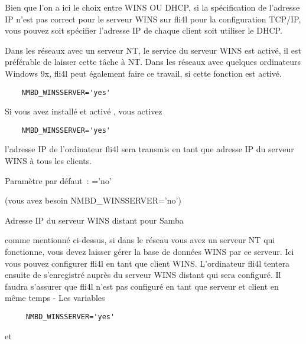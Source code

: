 \begin{description}
    Bien que l'on a ici le choix entre WINS OU DHCP, si la spécification de
    l'adresse IP n'est pas correct pour le serveur WINS sur fli4l pour la
    configuration TCP/IP, vous pouvez soit spécifier l'adresse IP de chaque
    client soit utiliser le DHCP.

    Dans les réseaux avec un serveur NT, le service du serveur WINS est activé,
    il est préférable de laisser cette tâche à NT. Dans les réseaux avec
    quelques ordinateurs Windows 9x, fli4l peut également faire ce travail, si
    cette fonction est activé.

\begin{example}
\begin{verbatim}
    NMBD_WINSSERVER='yes'
\end{verbatim}
\end{example}

    Si vous avez installé et activé , vous activez

\begin{example}
\begin{verbatim}
    NMBD_WINSSERVER='yes'
\end{verbatim}
\end{example}

    l'adresse IP de l'ordinateur fli4l sera transmis en tant que adresse IP
    du serveur WINS à tous les clients.

    Paramètre par défaut~: ='no'


 (vous avez besoin NMBD\_WINSSERVER='no')

    Adresse IP du serveur WINS distant pour Samba

    comme mentionné ci-dessus, si dans le réseau vous avez un serveur NT qui
    fonctionne, vous devez laisser gérer la base de données WINS par ce serveur.
    Ici vous pouvez configurer fli4l en tant que client WINS. L'ordinateur fli4l
    tentera ensuite de s'enregistré auprès du serveur WINS distant qui sera
    configuré. Il faudra s'assurer que fli4l n'est pas configuré en tant
    que serveur et client en même temps - Les variables

\begin{example}
\begin{verbatim}
     NMBD_WINSSERVER='yes'
\end{verbatim}
\end{example}

    et


\end{description}
